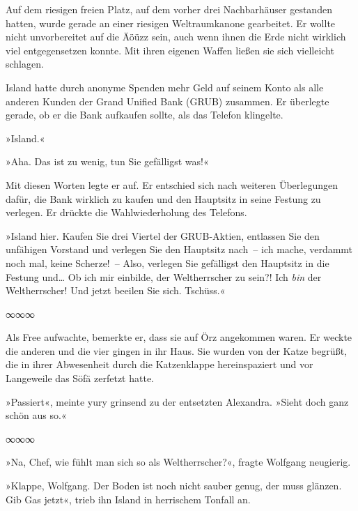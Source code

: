 Auf dem riesigen freien Platz, auf dem vorher drei Nachbarhäuser gestanden hatten, wurde gerade an einer riesigen Weltraumkanone gearbeitet. Er wollte nicht unvorbereitet auf die Äöüzz sein, auch wenn ihnen die Erde nicht wirklich viel entgegensetzen konnte. Mit ihren eigenen Waffen ließen sie sich vielleicht schlagen.

Island hatte durch anonyme Spenden mehr Geld auf seinem Konto als alle anderen Kunden der Grand Unified Bank (GRUB) zusammen. Er überlegte gerade, ob er die Bank aufkaufen sollte, als das Telefon klingelte.

»Island.«


»Aha. Das ist zu wenig, tun Sie gefälligst was!«

Mit diesen Worten legte er auf. Er entschied sich nach weiteren Überlegungen dafür, die Bank wirklich zu kaufen und den Hauptsitz in seine Festung zu verlegen. Er drückte die Wahlwiederholung des Telefons.

»Island hier. Kaufen Sie drei Viertel der GRUB-Aktien, entlassen Sie den unfähigen Vorstand und verlegen Sie den Hauptsitz nach~– ich mache, verdammt noch mal, keine Scherze!~– Also, verlegen Sie gefälligst den Hauptsitz in die Festung und… Ob ich mir einbilde, der Weltherrscher zu sein?! Ich \emph{bin} der Weltherrscher! Und jetzt beeilen Sie sich. Tschüss.«

\begin{center}
    ∞∞∞
\end{center}

Als Free aufwachte, bemerkte er, dass sie auf Örz angekommen waren. Er weckte die anderen und die vier gingen in ihr Haus. Sie wurden von der Katze begrüßt, die in ihrer Abwesenheit durch die Katzenklappe hereinspaziert und vor Langeweile das Söfä zerfetzt hatte.

»Passiert«, meinte yury grinsend zu der entsetzten Alexandra. »Sieht doch ganz schön aus so.«

\begin{center}
    ∞∞∞
\end{center}

»Na, Chef, wie fühlt man sich so als Weltherrscher?«, fragte Wolfgang neugierig.

»Klappe, Wolfgang. Der Boden ist noch nicht sauber genug, der muss glänzen. Gib Gas jetzt«, trieb ihn Island in herrischem Tonfall an.

